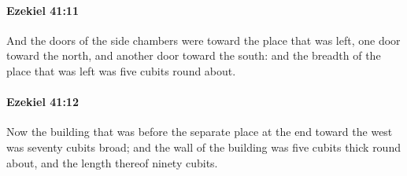 		\paragraph{Ezekiel 41:11} %
			\label{EZEKIEL-41-11}

			And the doors of the side chambers were toward the place that was left, one door toward the north, and another door toward the south: and the breadth of the place that was left was five cubits round about.


		\paragraph{Ezekiel 41:12} %
			\label{EZEKIEL-41-12}

			Now the building that was before the separate place at the end toward the west was seventy cubits broad; and the wall of the building was five cubits thick round about, and the length thereof ninety cubits.

